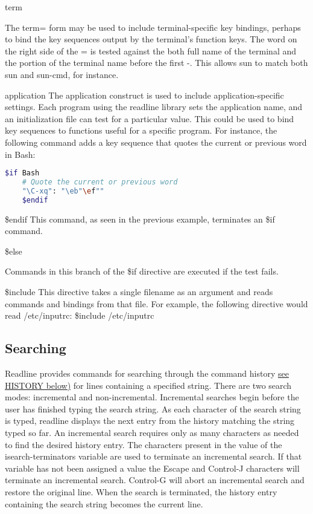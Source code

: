 term

The term= form may be used to include terminal-specific key bindings, perhaps to bind the key sequences output by the terminal's function keys. The word on the right side of the = is tested against the both full name of the terminal and the portion of the terminal name before the first -. This allows sun to match both sun and sun-cmd, for instance.

application
The application construct is used to include application-specific settings. Each program using the readline library sets the application name, and an initialization file can test for a particular value. This could be used to bind key sequences to functions useful for a specific program. For instance, the following command adds a key sequence that quotes the current or previous word in Bash:

\begin{lstlisting}[language=bash]
    $if Bash
    # Quote the current or previous word
    "\C-xq": "\eb"\ef""
    $endif
\end{lstlisting} %


\$endif
This command, as seen in the previous example, terminates an \$if command.

\$else

Commands in this branch of the \$if directive are executed if the test fails.

\$include
This directive takes a single filename as an argument and reads commands and bindings from that file. For example, the following directive would read /etc/inputrc:
\$include  /etc/inputrc

\subsection{Searching}\label{sec:searching}

Readline provides commands for searching through the command history \hyperref[sec:history]{see HISTORY below)} for lines containing a specified string. There are two search modes: incremental and non-incremental.
Incremental searches begin before the user has finished typing the search string. As each character of the search string is typed, readline displays the next entry from the history matching the string typed so far. An incremental search requires only as many characters as needed to find the desired history entry. The characters present in the value of the isearch-terminators variable are used to terminate an incremental search. If that variable has not been assigned a value the Escape and Control-J characters will terminate an incremental search. Control-G will abort an incremental search and restore the original line. When the search is terminated, the history entry containing the search string becomes the current line.

